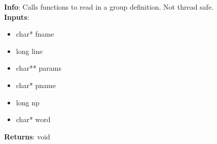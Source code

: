 \textbf{Info}: Calls functions to read in a group definition. Not thread safe.\\

\noindent \textbf{Inputs}:
\begin{itemize}
\item{char* fname}
\item{long line}
\item{char** params}
\item{char* pname}
\item{long np}
\item{char* word}
\end{itemize}

\noindent \textbf{Returns}: void
